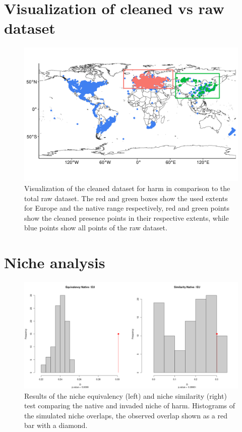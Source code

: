 \newpage
\appendix

\section{Visualization of cleaned vs raw dataset}

\begin{figure}[!h]
    \centering
    \includegraphics[width = 0.8\linewidth]{"../../R/figures/raw-vs-cleaned-glob.png"}
    \caption{\label{fig:raw_vs_cleaned_glob} Visualization of the cleaned dataset for \gls{harm} in comparison to the total raw dataset. The red and green boxes show the used extents for Europe and the native range respectively, red and green points show the cleaned presence points in their respective extents, while blue points show all points of the raw dataset.}
\end{figure}



\section{Niche analysis}

\begin{figure}[!h]
    \centering
    \includegraphics[width = 0.9\linewidth]{"../../R/figures/as-eu-tot-eq-sim.png"}
    \caption{\label{fig:as_eu_eq_sim} Results of the niche equivalency (left) and niche similarity (right) test comparing the native and invaded niche of \gls{harm}. Histograms of the simulated niche overlaps, the observed overlap shown as a red bar with a diamond.}
\end{figure}

